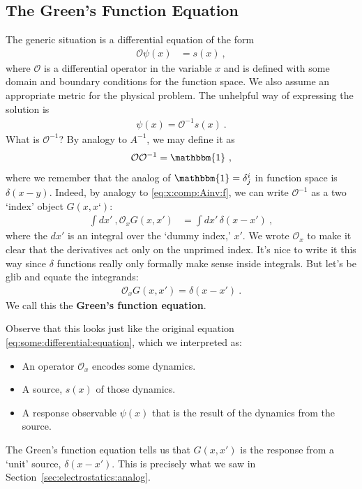 \documentclass[12pt]{article}
\numberwithin{equation}{section}    %
\begin{document}
\subsection{The Green’s Function Equation}

The generic situation is a differential equation of the form
\begin{align}
  \mathcal O \psi(x) &= s(x) \ ,
  \label{eq:some:differential:equation}
\end{align}
where $\mathcal O$ is a differential operator in the variable $x$ and is defined with some domain and boundary conditions for the function space. We also assume an appropriate metric for the physical problem. The unhelpful way of expressing the solution is
\begin{align}
  \psi(x) = \mathcal O^{-1} s(x) \ .
\end{align}
What is $\mathcal O^{-1}$? By analogy to $A^{-1}$, we may define it as
\begin{align}
  \mathcal O \mathcal O^{-1} = \mathbbm{1} \ ,
\end{align}
where we remember that the analog of $\mathbbm{1} = \delta^i_j$ in function space is $\delta(x-y)$. Indeed, by analogy to \eqref{eq:x:comp:Ainv:f}, we can write $\mathcal O^{-1}$ as a two `index’ object $G(x,x‘)$:
\begin{align}
 \int dx'\ , \mathcal O_x G(x,x') &= \int dx'\,\delta(x-x') \ ,
\end{align}
where the $dx'$ is an integral over the `dummy index,' $x'$. We wrote $\mathcal O_x$ to make it clear that the derivatives act only on the unprimed index. It’s nice to write it this way since $\delta$ functions really only formally make sense inside integrals. But let’s be glib and equate the integrands:
\begin{align}
  \mathcal O_x G(x,x') = \delta(x-x') \ .
  \label{eq:Greens:function:equation}
\end{align}
We call this the \textbf{Green’s function equation}. 

Observe that this looks just like the original equation \eqref{eq:some:differential:equation}, which we interpreted as:
\begin{itemize}
  \item An operator $\mathcal O_x$ encodes some dynamics.
  \item A source, $s(x)$ of those dynamics.
  \item A response observable $\psi(x)$ that is the result of the dynamics from the source.
\end{itemize}
The Green’s function equation tells us that $G(x,x')$ is the response from a `unit’ source, $\delta(x-x')$. This is precisely what we saw in Section~\ref{sec:electrostatics:analog}. 
\end{document}
